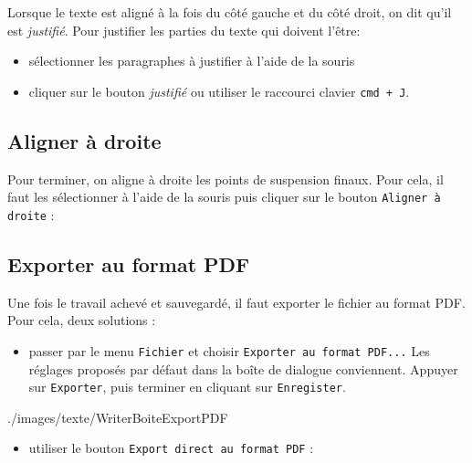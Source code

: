 Lorsque le texte est aligné à la fois du côté gauche et du côté droit, on dit qu'il est \emph{justifié}. Pour justifier les parties du texte qui doivent l'être:

\begin{itemize}
\item sélectionner les paragraphes à justifier à l'aide de la souris
\item cliquer sur le bouton \emph{justifié} ou utiliser le raccourci clavier \texttt{cmd + J}. 
\end{itemize}






\subsection{Aligner à droite}  

Pour terminer, on aligne à droite les points de suspension finaux. Pour cela, il faut les sélectionner à l'aide de la souris puis cliquer sur le bouton \texttt{Aligner à droite} :  




\subsection{Exporter au format PDF}

Une fois le travail achevé et sauvegardé, il faut exporter le fichier au format PDF. Pour cela, deux solutions :
\begin{itemize}\item passer par le menu \texttt{Fichier} et choisir \texttt{Exporter au format PDF...} Les réglages proposés par défaut dans la boîte de dialogue conviennent. Appuyer sur \texttt{Exporter}, puis terminer en cliquant sur \texttt{Enregister}.\end{itemize} 

%
                {./images/texte/WriterBoiteExportPDF}{\textwidth}

\begin{itemize}\item utiliser le bouton \texttt{Export direct au format PDF} :\end{itemize} 

